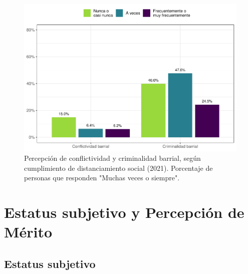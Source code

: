 \documentclass[
  12pt,
]{book}
\begin{document}
\begin{figure}

{\centering \includegraphics{reporte-elsoc_files/figure-latex/dist-barrio-1} 

}

\caption{Percepción de conflictividad y criminalidad barrial, según cumplimiento de distanciamiento social (2021). Porcentaje de personas que responden "Muchas veces o siempre".}\label{fig:dist-barrio}
\end{figure}

\hypertarget{estatus-subjetivo-y-percepciuxf3n-de-muxe9rito}{%
\chapter{Estatus subjetivo y Percepción de Mérito}\label{estatus-subjetivo-y-percepciuxf3n-de-muxe9rito}}

\hypertarget{estatus-subjetivo}{%
\section{Estatus subjetivo}\label{estatus-subjetivo}}
\end{document}
